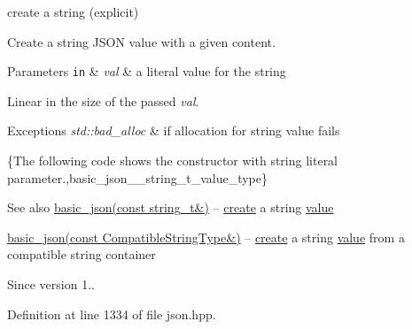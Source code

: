 create a string (explicit) 

Create a string J\+S\+O\+N value with a given content.


\begin{DoxyParams}[1]{Parameters}
\mbox{\tt in}  & {\em val} & a literal value for the string\\
\hline
\end{DoxyParams}
Linear in the size of the passed {\itshape val}.


\begin{DoxyExceptions}{Exceptions}
{\em std\+::bad\+\_\+alloc} & if allocation for string value fails\\
\hline
\end{DoxyExceptions}
\{The following code shows the constructor with string literal parameter.,basic\+\_\+json\+\_\+\+\_\+string\+\_\+t\+\_\+value\+\_\+type\}

\begin{DoxySeeAlso}{See also}
\hyperlink{classnlohmann_1_1basic__json_ab8b43d92a042dde96c28aeea81dd52de}{basic\+\_\+json(const string\+\_\+t\&)} -- \hyperlink{classnlohmann_1_1basic__json_a27df4303fbc83071275074486b54a40e}{create} a string \hyperlink{classnlohmann_1_1basic__json_a0a2cbbd95862a623e7dc5c37e67dead0}{value} 

\hyperlink{classnlohmann_1_1basic__json_ae85d91b0620650bcd9993e09d0e287d9}{basic\+\_\+json(const Compatible\+String\+Type\&)} -- \hyperlink{classnlohmann_1_1basic__json_a27df4303fbc83071275074486b54a40e}{create} a string \hyperlink{classnlohmann_1_1basic__json_a0a2cbbd95862a623e7dc5c37e67dead0}{value} from a compatible string container
\end{DoxySeeAlso}
\begin{DoxySince}{Since}
version 1.. 
\end{DoxySince}


Definition at line 1334 of file json.\+hpp.

\hypertarget{classnlohmann_1_1basic__json_ae85d91b0620650bcd9993e09d0e287d9}{}
